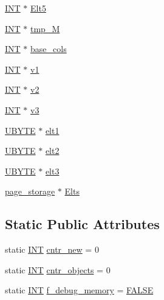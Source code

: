 \begin{DoxyCompactItemize}
\item 
\mbox{\hyperlink{galois_8h_a09fddde158a3a20bd2dcadb609de11dc}{I\+NT}} $\ast$ \mbox{\hyperlink{classmatrix__group_ada5f7b9fa354ab8a25fe8d67ef0f7eb6}{Elt5}}
\item 
\mbox{\hyperlink{galois_8h_a09fddde158a3a20bd2dcadb609de11dc}{I\+NT}} $\ast$ \mbox{\hyperlink{classmatrix__group_ac9d69fc6778b936a22f59c92ffe68f1e}{tmp\+\_\+M}}
\item 
\mbox{\hyperlink{galois_8h_a09fddde158a3a20bd2dcadb609de11dc}{I\+NT}} $\ast$ \mbox{\hyperlink{classmatrix__group_a2b8d2ba90b5990ee7de25de2219f3097}{base\+\_\+cols}}
\item 
\mbox{\hyperlink{galois_8h_a09fddde158a3a20bd2dcadb609de11dc}{I\+NT}} $\ast$ \mbox{\hyperlink{classmatrix__group_ad15b042a324c3c17c312305a339acbaa}{v1}}
\item 
\mbox{\hyperlink{galois_8h_a09fddde158a3a20bd2dcadb609de11dc}{I\+NT}} $\ast$ \mbox{\hyperlink{classmatrix__group_a9f2bb6e87803452f172dbf86e2ac262d}{v2}}
\item 
\mbox{\hyperlink{galois_8h_a09fddde158a3a20bd2dcadb609de11dc}{I\+NT}} $\ast$ \mbox{\hyperlink{classmatrix__group_ab38d936ea3f79e0ec0cb1ab967227bf0}{v3}}
\item 
\mbox{\hyperlink{galois_8h_a122c4acf389c050379f00341fdcd5812}{U\+B\+Y\+TE}} $\ast$ \mbox{\hyperlink{classmatrix__group_a2134904ce4827cea1ea77b5f2d7bde48}{elt1}}
\item 
\mbox{\hyperlink{galois_8h_a122c4acf389c050379f00341fdcd5812}{U\+B\+Y\+TE}} $\ast$ \mbox{\hyperlink{classmatrix__group_af8d35a59a84ef6c7151195f7f8e88cfe}{elt2}}
\item 
\mbox{\hyperlink{galois_8h_a122c4acf389c050379f00341fdcd5812}{U\+B\+Y\+TE}} $\ast$ \mbox{\hyperlink{classmatrix__group_ac9c3b9effd127c47f6e1ac8cfc1d1d6a}{elt3}}
\item 
\mbox{\hyperlink{classpage__storage}{page\+\_\+storage}} $\ast$ \mbox{\hyperlink{classmatrix__group_ab676ca569c462e5113ec2f7dbc09a137}{Elts}}
\end{DoxyCompactItemize}
\subsection*{Static Public Attributes}
\begin{DoxyCompactItemize}
\item 
static \mbox{\hyperlink{galois_8h_a09fddde158a3a20bd2dcadb609de11dc}{I\+NT}} \mbox{\hyperlink{classmatrix__group_aa77c0621db1e0d531960430f916e5382}{cntr\+\_\+new}} = 0
\item 
static \mbox{\hyperlink{galois_8h_a09fddde158a3a20bd2dcadb609de11dc}{I\+NT}} \mbox{\hyperlink{classmatrix__group_aa536964733f27076d71ee090f92a8eba}{cntr\+\_\+objects}} = 0
\item 
static \mbox{\hyperlink{galois_8h_a09fddde158a3a20bd2dcadb609de11dc}{I\+NT}} \mbox{\hyperlink{classmatrix__group_a59f1f3339e7f93e640d4158a482374c2}{f\+\_\+debug\+\_\+memory}} = \mbox{\hyperlink{nauty_8h_aa93f0eb578d23995850d61f7d61c55c1}{F\+A\+L\+SE}}
\end{DoxyCompactItemize}



